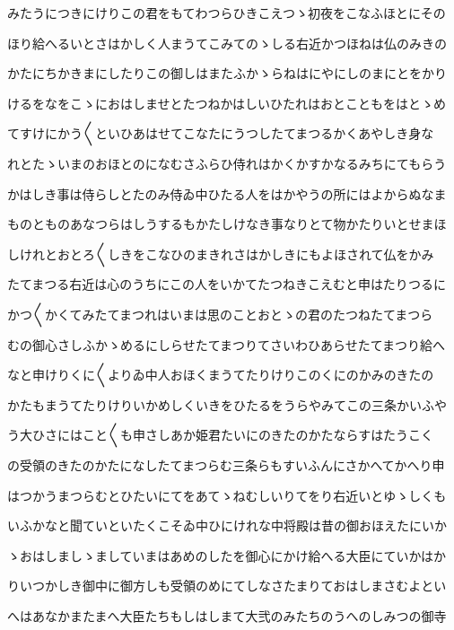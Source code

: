 \documentclass[a4paper,11pt,landscape]{ltjtarticle}
\begin{document}
\par\medskip
みたうにつきにけりこの君をもてわつらひきこえつゝ初夜をこなふほとにその
\par\medskip
ほり給へるいとさはかしく人まうてこみてのゝしる右近かつほねは仏のみきの
\par\medskip
かたにちかきまにしたりこの御しはまたふかゝらねはにやにしのまにとをかり
\par\medskip
けるをなをこゝにおはしませとたつねかはしいひたれはおとこともをはとゝめ
\par\medskip
てすけにかう〱といひあはせてこなたにうつしたてまつるかくあやしき身な
\par\medskip
れとたゝいまのおほとのになむさふらひ侍れはかくかすかなるみちにてもらう
\par\medskip
かはしき事は侍らしとたのみ侍ゐ中ひたる人をはかやうの所にはよからぬなま
\par\medskip
ものとものあなつらはしうするもかたしけなき事なりとて物かたりいとせまほ
\par\medskip
しけれとおとろ〱しきをこなひのまきれさはかしきにもよほされて仏をかみ
\par\medskip
たてまつる右近は心のうちにこの人をいかてたつねきこえむと申はたりつるに
\par\medskip
かつ〱かくてみたてまつれはいまは思のことおとゝの君のたつねたてまつら
\par\medskip
むの御心さしふかゝめるにしらせたてまつりてさいわひあらせたてまつり給へ
\par\medskip
なと申けりくに〱よりゐ中人おほくまうてたりけりこのくにのかみのきたの
\par\medskip
かたもまうてたりけりいかめしくいきをひたるをうらやみてこの三条かいふや
\par\medskip
う大ひさにはこと〱も申さしあか姫君たいにのきたのかたならすはたうこく
\par\medskip
の受領のきたのかたになしたてまつらむ三条らもすいふんにさかへてかへり申
\par\medskip
はつかうまつらむとひたいにてをあてゝねむしいりてをり右近いとゆゝしくも
\par\medskip
いふかなと聞ていといたくこそゐ中ひにけれな中将殿は昔の御おほえたにいか
\par\medskip
ゝおはしましゝましていまはあめのしたを御心にかけ給へる大臣にていかはか
\par\medskip
りいつかしき御中に御方しも受領のめにてしなさたまりておはしまさむよとい
\par\medskip
へはあなかまたまへ大臣たちもしはしまて大弐のみたちのうへのしみつの御寺
\par\medskip
\end{document}
